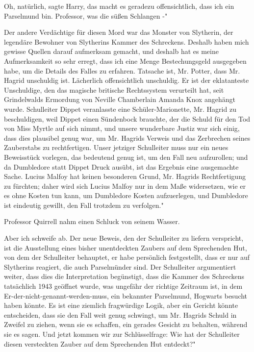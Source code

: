 \glqq Oh, natürlich\grqq{}, sagte Harry, \glqq das macht es geradezu
offensichtlich, dass ich ein Parselmund bin. Professor, was die süßen Schlangen
-"

\glqq Der andere Verdächtige für diesen Mord war das Monster von Slytherin, der
legendäre Bewohner von Slytherins Kammer des Schreckens. Deshalb haben mich
gewisse Quellen darauf aufmerksam gemacht, und deshalb hat es meine
Aufmerksamkeit so sehr erregt, dass ich eine Menge Bestechungsgeld ausgegeben
habe, um die Details des Falles zu erfahren. Tatsache ist, Mr. Potter, dass Mr.
Hagrid unschuldig ist. Lächerlich offensichtlich unschuldig. Er ist der
eklatanteste Unschuldige, den das magische britische Rechtssystem verurteilt
hat, seit Grindelwalds Ermordung von Neville Chamberlain Amanda Knox angehängt
wurde. Schulleiter Dippet veranlasste eine Schüler-Marionette, Mr. Hagrid zu
beschuldigen, weil Dippet einen Sündenbock brauchte, der die Schuld für den Tod
von Miss Myrtle auf sich nimmt, und unsere wunderbare Justiz war sich einig,
dass dies plausibel genug war, um Mr. Hagrids Verweis und das Zerbrechen seines
Zauberstabs zu rechtfertigen. Unser jetziger Schulleiter muss nur ein neues
Beweisstück vorlegen, das bedeutend genug ist, um den Fall neu aufzurollen; und
da Dumbledore statt Dippet Druck ausübt, ist das Ergebnis eine ausgemachte
Sache. Lucius Malfoy hat keinen besonderen Grund, Mr. Hagrids Rechtfertigung zu
fürchten; daher wird sich Lucius Malfoy nur in dem Maße widersetzen, wie er es
ohne Kosten tun kann, um Dumbledore Kosten aufzuerlegen, und Dumbledore ist
eindeutig gewillt, den Fall trotzdem zu verfolgen."

Professor Quirrell nahm einen Schluck von seinem Wasser.

\glqq Aber ich schweife ab. Der neue Beweis, den der Schulleiter zu liefern
verspricht, ist die Ausstellung eines bisher unentdeckten Zaubers auf dem
Sprechenden Hut, von dem der Schulleiter behauptet, er habe persönlich
festgestellt, dass er nur auf Slytherins reagiert, die auch Parselmünder sind.
Der Schulleiter argumentiert weiter, dass dies die Interpretation begünstigt,
dass die Kammer des Schreckens tatsächlich 1943 geöffnet wurde, was ungefähr der
richtige Zeitraum ist, in dem Er-der-nicht-genannt-werden-muss, ein bekannter
Parselmund, Hogwarts besucht haben könnte. Es ist eine ziemlich fragwürdige
Logik, aber ein Gericht könnte entscheiden, dass sie den Fall weit genug
schwingt, um Mr. Hagrids Schuld in Zweifel zu ziehen, wenn sie es schaffen, ein
gerades Gesicht zu behalten, während sie es sagen. Und jetzt kommen wir zur
Schlüsselfrage: Wie hat der Schulleiter diesen versteckten Zauber auf dem
Sprechenden Hut entdeckt?"

